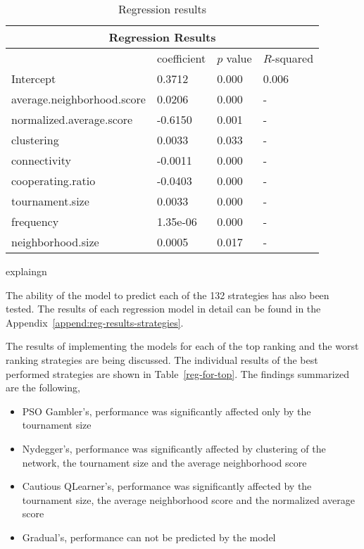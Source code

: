 \begin{table}[!hbtp]
	\centering
	\begin{adjustbox}{width=0.7\textwidth}
		\small
		\begin{tabular}{llll}
			\toprule
			\multicolumn{4}{|c|}{\textbf{Regression Results}}         \\ \hline
			                           & coefficient & \(p\) value & \(R\)-squared \\ \hline
			Intercept                  & 0.3712      & 0.000       & 0.006     \\ \hline
			average.neighborhood.score & 0.0206      & 0.000       & -         \\ \hline
			normalized.average.score   & -0.6150     & 0.001       & -         \\ \hline
			clustering                 & 0.0033      & 0.033       & -         \\ \hline
			connectivity               & -0.0011     & 0.000       & -         \\ \hline
			cooperating.ratio          & -0.0403     & 0.000       & -         \\ \hline
			tournament.size            & 0.0033      & 0.000       & -         \\ \hline
			frequency                  & 1.35e-06    & 0.000       & -         \\ \hline
			neighborhood.size          & 0.0005      & 0.017       & -         \\ \bottomrule

		\end{tabular}
	\end{adjustbox}
	\caption{Regression results}
	\label{regression-complex-networks}
	explaingn
\end{table}

The ability of the model to predict each of the 132 strategies has also been
tested. The results of each regression model in detail can be found in the
Appendix~\ref{append:reg-results-strategies}.

The results of implementing the models for each of the top ranking and the worst
ranking strategies are being discussed. The individual results of the best
performed strategies are shown in Table~\ref{reg-for-top}. The findings summarized
are the following,

\begin{itemize}
	\item PSO Gambler's, performance was significantly affected only by the tournament size
	\item Nydegger's, performance was significantly affected by clustering of the network,
	      the tournament size and the average neighborhood score
	\item Cautious QLearner's, performance was significantly affected by the tournament size,
	      the average neighborhood score and the normalized average score
	\item Gradual's, performance can not be predicted by the model
\end{itemize}

